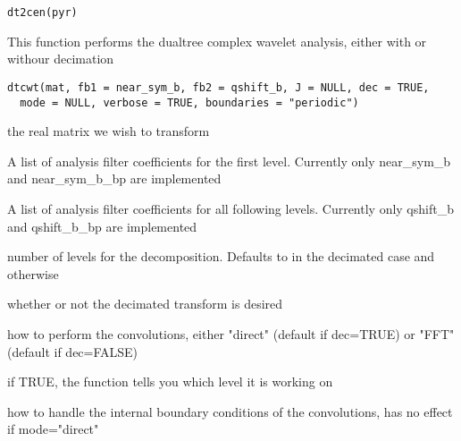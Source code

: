 \documentclass[a4paper]{book}
\begin{document}
%
\begin{Usage}
\begin{verbatim}
dt2cen(pyr)
\end{verbatim}
\end{Usage}
%
\begin{Description}\relax
This function performs the dualtree complex wavelet analysis, either with or withour decimation
\end{Description}
%
\begin{Usage}
\begin{verbatim}
dtcwt(mat, fb1 = near_sym_b, fb2 = qshift_b, J = NULL, dec = TRUE,
  mode = NULL, verbose = TRUE, boundaries = "periodic")
\end{verbatim}
\end{Usage}
%
\begin{Arguments}
\begin{ldescription}
\item[\code{mat}] the real matrix we wish to transform

\item[\code{fb1}] A list of analysis filter coefficients for the first level. Currently only near\_sym\_b and near\_sym\_b\_bp are implemented

\item[\code{fb2}] A list of analysis filter coefficients for all following levels. Currently only qshift\_b and qshift\_b\_bp are implemented

\item[\code{J}] number of levels for the decomposition. Defaults to  in the decimated case and  otherwise

\item[\code{dec}] whether or not the decimated transform is desired

\item[\code{mode}] how to perform the convolutions, either "direct" (default if dec=TRUE) or "FFT" (default if dec=FALSE)

\item[\code{verbose}] if TRUE, the function tells you which level it is working on

\item[\code{boundaries}] how to handle the internal boundary conditions of the convolutions, has no effect if mode="direct"
\end{ldescription}
\end{Arguments}
\end{document}
